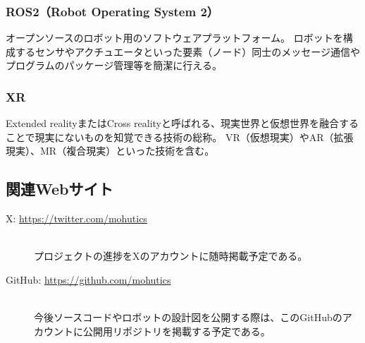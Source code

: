 \documentclass[uplatex,a4paper,12pt]{jsarticle}
\begin{document}
\subsubsection*{ROS2（Robot Operating System 2） \label{term:ros2}}
オープンソースのロボット用のソフトウェアプラットフォーム。
ロボットを構成するセンサやアクチュエータといった要素（ノード）同士のメッセージ通信やプログラムのパッケージ管理等を簡潔に行える。

\subsubsection*{XR \label{term:xr}}
Extended realityまたはCross realityと呼ばれる、現実世界と仮想世界を融合することで現実にないものを知覚できる技術の総称。
VR（仮想現実）やAR（拡張現実）、MR（複合現実）といった技術を含む。

\subsection{関連Webサイト}
\begin{description}
  \item[X: \url{https://twitter.com/mohutics}]\mbox{}\\
  プロジェクトの進捗をXのアカウントに随時掲載予定である。
  \item[GitHub: \url{https://github.com/mohutics}]\mbox{}\\
  今後ソースコードやロボットの設計図を公開する際は、このGitHubのアカウントに公開用リポジトリを掲載する予定である。
\end{description}







\end{document}
